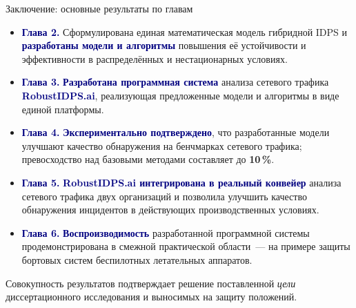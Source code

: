 \documentclass[10pt,aspectratio=169]{beamer}
\newcommand{\hl}[1]{\textcolor{accent}{\textbf{#1}}}
\newcommand{\bn}[1]{\textcolor{navy}{\textbf{#1}}}
\begin{document}
\begin{frame}{Заключение: основные результаты по главам}
\small
\begin{itemize}\setlength\itemsep{6pt}

\item \bn{Глава 2.} Сформулирована единая математическая
модель гибридной IDPS и \bn{разработаны модели и алгоритмы}
повышения её устойчивости и эффективности в распределённых
и нестационарных условиях.

\item \bn{Глава 3.} \bn{Разработана программная система}
анализа сетевого трафика \bn{RobustIDPS.ai}, реализующая
предложенные модели и алгоритмы в виде единой платформы.

\item \bn{Глава 4.} \bn{Экспериментально подтверждено}, что
разработанные модели улучшают качество обнаружения на
бенчмарках сетевого трафика; превосходство над базовыми
методами составляет до \hl{10\,\%}.

\item \bn{Глава 5.} \bn{RobustIDPS.ai интегрирована в
реальный конвейер} анализа сетевого трафика двух
организаций и позволила улучшить качество обнаружения
инцидентов в действующих производственных условиях.

\item \bn{Глава 6.} \bn{Воспроизводимость} разработанной
программной системы продемонстрирована в смежной
практической области~--- на примере защиты бортовых систем
беспилотных летательных аппаратов.

\end{itemize}
\medskip

\begin{block}{}
\footnotesize Совокупность результатов подтверждает решение
поставленной \emph{цели} диссертационного исследования и
выносимых на защиту положений.
\end{block}
\end{frame}
\end{document}
